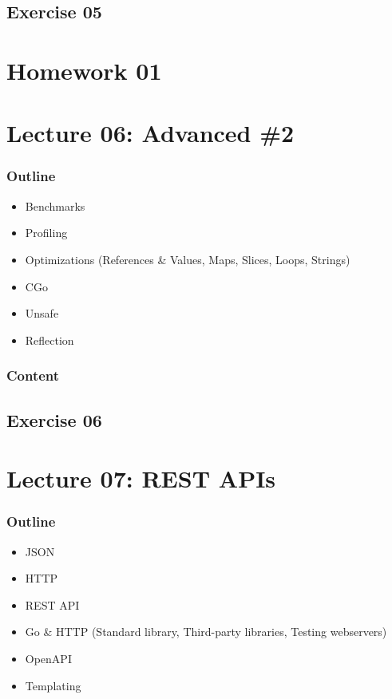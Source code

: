 \documentclass[
  digital,
  color,
  oneside,
  nosansbold,
  nocolorbold,
  lof,
  nolot,
]{fithesis4}
\begin{document}
\subsection{Exercise 05}

\section{Homework 01}

\section{Lecture 06: Advanced \#2}

\subsubsection{Outline}

\begin{itemize}
    \item Benchmarks
    \item Profiling
    \item Optimizations (References \& Values, Maps, Slices, Loops, Strings)
    \item CGo
    \item Unsafe
    \item Reflection
\end{itemize}

\subsubsection{Content}

\subsection{Exercise 06}

\section{Lecture 07: REST APIs}

\subsubsection{Outline}

\begin{itemize}
    \item JSON
    \item HTTP
    \item REST API
    \item Go \& HTTP (Standard library, Third-party libraries, Testing webservers)
    \item OpenAPI
    \item Templating
\end{itemize}
\end{document}
